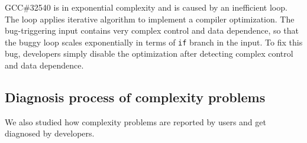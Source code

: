 GCC\#32540 is in exponential complexity and is caused by an inefficient loop. 
The loop applies iterative algorithm to implement a compiler optimization. 
The bug-triggering input contains very complex control and data dependence,  
so that the buggy loop scales exponentially in terms of \texttt{if} branch in the input. 
To fix this bug, developers simply disable the optimization 
after detecting complex control and data dependence.  



\subsection{Diagnosis process of complexity problems}
\label{sec:process}

We also studied how complexity problems are reported by users and get diagnosed by developers. 

